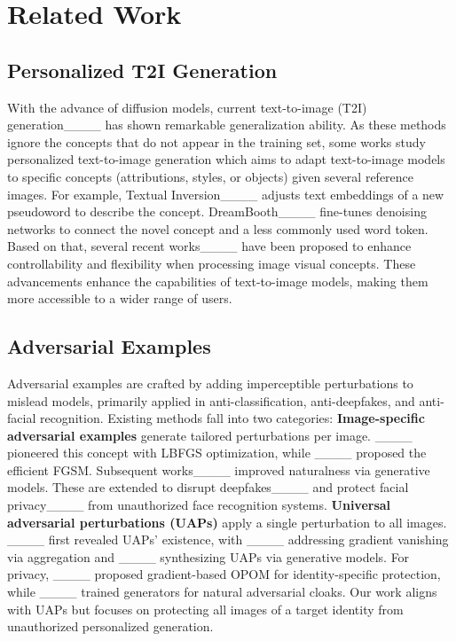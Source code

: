 \section{Related Work}
\subsection{Personalized T2I Generation}
With the advance of diffusion models, current text-to-image (T2I) generation____ has shown remarkable generalization ability. 
As these methods ignore the concepts that do not appear in the training set, some works study personalized text-to-image generation which aims to adapt text-to-image models to specific concepts (attributions, styles, or objects) given several reference images.
For example, Textual Inversion____ adjusts text embeddings of a new pseudoword to describe the concept. DreamBooth____ fine-tunes denoising networks to connect the novel concept and a less commonly used word token. 
Based on that, several recent works____ have been proposed to enhance controllability and flexibility when processing image visual concepts. 
These advancements enhance the capabilities of text-to-image models, making them more accessible to a wider range of users.


\subsection{Adversarial Examples}
Adversarial examples are crafted by adding imperceptible perturbations to mislead models, primarily applied in anti-classification, anti-deepfakes, and anti-facial recognition. Existing methods fall into two categories:  
\textbf{Image-specific adversarial examples} generate tailored perturbations per image. ____ pioneered this concept with LBFGS optimization, while ____ proposed the efficient FGSM. Subsequent works____ improved naturalness via generative models. These are extended to disrupt deepfakes____ and protect facial privacy____ from unauthorized face recognition systems.  
\textbf{Universal adversarial perturbations (UAPs)} apply a single perturbation to all images. ____ first revealed UAPs' existence, with ____ addressing gradient vanishing via aggregation and ____ synthesizing UAPs via generative models. 
For privacy, ____ proposed gradient-based OPOM for identity-specific protection, while ____ trained generators for natural adversarial cloaks. Our work aligns with UAPs but focuses on protecting all images of a target identity from unauthorized personalized generation.

